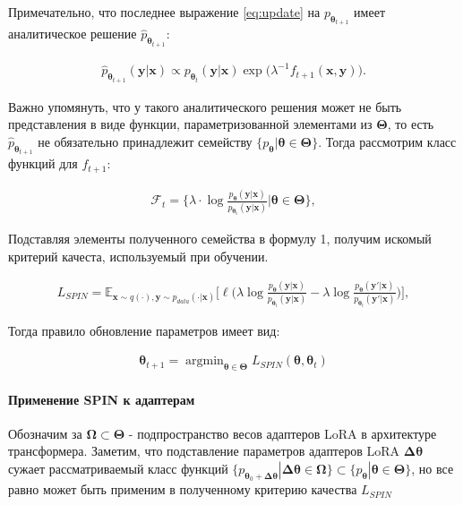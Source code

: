 \documentclass[12pt, twoside]{article}
\newcommand{\bx}{\mathbf{x}}
\newcommand{\by}{\mathbf{y}}
\newcommand{\bOmega}{\boldsymbol{\Omega}}
\newcommand{\btheta}{\boldsymbol{\theta}}
\newcommand{\bTheta}{\boldsymbol{\Theta}}
\newcommand{\bDelta}{\boldsymbol{\Delta}}
\newcommand{\cF}{\mathcal{F}}
\newcommand{\EE}{\mathbb{E}}
\newcommand{\argmin}{\mathop{\mathrm{argmin}}}
\begin{document}
Примечательно, что последнее выражение \eqref{eq:update} на $p_{\btheta_{t+1}}$ имеет аналитическое решение $\hat p_{\btheta_{t+1}}$:

\begin{align}
\hat{p}_{\btheta_{t+1}}(\by|\bx) \propto p_{\btheta_t}(\by|\bx) \exp\big(\lambda^{-1}f_{t+1}(\bx, \by)\big). \label{eq:closed form solution}  
\end{align}

Важно упомянуть, что у такого аналитического решения может не быть представления в виде функции, параметризованной элементами из $\bTheta$, то есть $\hat{p}_{\btheta_{t+1}}$ не обязательно принадлежит семейству $\{p_{\btheta} | \btheta \in \bTheta\}$. Тогда рассмотрим класс функций для $f_{t+1}$:

\begin{align}
\cF_{t} = \bigg\{\lambda\cdot \log \frac{p_{\btheta}(\by | \bx)}{p_{\mathrm{\btheta_t}}(\by | \bx)}\bigg|\btheta \in \bTheta\bigg\},   \label{eq:function class0} 
\end{align}

Подставляя элементы полученного семейства в формулу 1, получим искомый критерий качеста, используемый при обучении.

\begin{align}
L_{SPIN}= \EE_{\bx\sim q(\cdot), \by\sim p_{data}(\cdot | \bx)}\bigg[\ell\bigg(\lambda \log \frac{p_{\btheta}(\by | \bx)}{p_{\btheta_t}(\by | \bx)}-\lambda \log \frac{p_{\btheta}(\by' | \bx)}{p_{\btheta_t}(\by' | \bx)}\bigg)\bigg], \label{eq:loss}  
\end{align}

Тогда правило обновление параметров имеет вид:

\begin{align}
    \btheta_{t+1} = \argmin_{\btheta \in \bTheta} L_{SPIN} (\btheta, \btheta_t)
\end{align}


\paragraph{Применение SPIN к адаптерам}

Обозначим за $\bOmega \subset \bTheta$ - подпространство весов адаптеров LoRA в архитектуре трансформера. Заметим, что подставление параметров адаптеров LoRA $\bDelta\btheta$ сужает рассматриваемый класс функций $\{p_{\btheta_0 + \bDelta\btheta} | \bDelta\btheta \in \bOmega\} \subset \{p_{\btheta} | \btheta \in \bTheta\}$, но все равно может быть применим в полученному критерию качества $L_{SPIN}$
\end{document}
